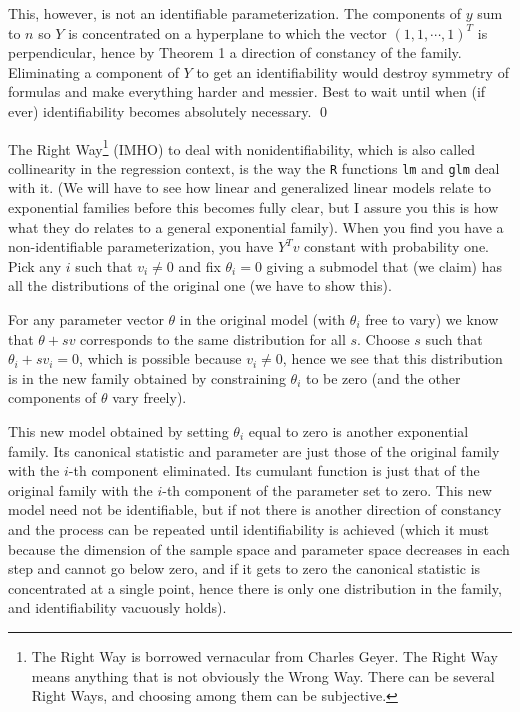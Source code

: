 \documentclass[
]{article}
\begin{document}
This, however, is not an identifiable parameterization. The components
of \(y\) sum to \(n\) so \(Y\) is concentrated on a hyperplane to which
the vector \((1,1, \cdots, 1)^T\) is perpendicular, hence by Theorem 1 a
direction of constancy of the family. Eliminating a component of \(Y\)
to get an identifiability would destroy symmetry of formulas and make
everything harder and messier. Best to wait until when (if ever)
identifiability becomes absolutely necessary. \qed

\vspace{0.5cm}

The Right
Way\footnote{The Right Way is borrowed vernacular from Charles Geyer. The Right Way means anything that is not obviously the Wrong Way. There can be several Right Ways, and choosing among them can be subjective.}
(IMHO) to deal with nonidentifiability, which is also called
collinearity in the regression context, is the way the \texttt{R}
functions \texttt{lm} and \texttt{glm} deal with it. (We will have to
see how linear and generalized linear models relate to exponential
families before this becomes fully clear, but I assure you this is how
what they do relates to a general exponential family). When you find you
have a non-identifiable parameterization, you have \(Y^Tv\) constant
with probability one. Pick any \(i\) such that \(v_i \neq 0\) and fix
\(\theta_i = 0\) giving a submodel that (we claim) has all the
distributions of the original one (we have to show this).

For any parameter vector \(\theta\) in the original model (with
\(\theta_i\) free to vary) we know that \(\theta + sv\) corresponds to
the same distribution for all \(s\). Choose \(s\) such that
\(\theta_i + sv_i = 0\), which is possible because \(v_i \neq 0\), hence
we see that this distribution is in the new family obtained by
constraining \(\theta_i\) to be zero (and the other components of
\(\theta\) vary freely).

This new model obtained by setting \(\theta_i\) equal to zero is another
exponential family. Its canonical statistic and parameter are just those
of the original family with the \(i\)-th component eliminated. Its
cumulant function is just that of the original family with the \(i\)-th
component of the parameter set to zero. This new model need not be
identifiable, but if not there is another direction of constancy and the
process can be repeated until identifiability is achieved (which it must
because the dimension of the sample space and parameter space decreases
in each step and cannot go below zero, and if it gets to zero the
canonical statistic is concentrated at a single point, hence there is
only one distribution in the family, and identifiability vacuously
holds).
\end{document}
